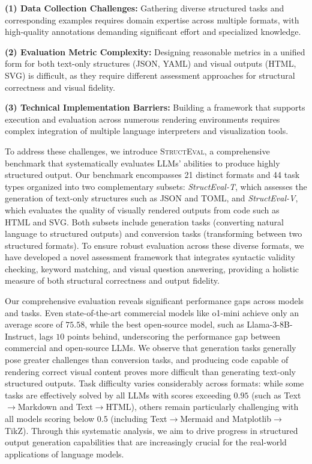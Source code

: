 \noindent \textbf{(1) Data Collection Challenges:} Gathering diverse structured tasks and corresponding examples requires domain expertise across multiple formats, with high-quality annotations demanding significant effort and specialized knowledge.

\noindent \textbf{(2) Evaluation Metric Complexity:} Designing reasonable metrics in a unified form for both text-only structures (JSON, YAML) and visual outputs (HTML, SVG) is difficult, as they require different assessment approaches for structural correctness and visual fidelity.

\noindent \textbf{(3) Technical Implementation Barriers:} Building a framework that supports execution and evaluation across numerous rendering environments requires complex integration of multiple language interpreters and visualization tools.

To address these challenges, we introduce \textsc{StructEval}, a comprehensive benchmark that systematically evaluates LLMs' abilities to produce highly structured output. Our benchmark encompasses 21 distinct formats and 44 task types organized into two complementary subsets: \emph{StructEval-T}, which assesses the generation of text-only structures such as JSON and TOML, and \emph{StructEval-V}, which evaluates the quality of visually rendered outputs from code such as HTML and SVG. Both subsets include generation tasks (converting natural language to structured outputs) and conversion tasks (transforming between two structured formats). To ensure robust evaluation across these diverse formats, we have developed a novel assessment framework that integrates syntactic validity checking, keyword matching, and visual question answering, providing a holistic measure of both structural correctness and output fidelity.


Our comprehensive evaluation reveals significant performance gaps across models and tasks. Even state-of-the-art commercial models like o1-mini achieve only an average score of $75.58$, while the best open-source model, such as Llama-3-8B-Instruct, lags $10$ points behind, underscoring the performance gap between commercial and open-source LLMs. We observe that generation tasks generally pose greater challenges than conversion tasks, and producing code capable of rendering correct visual content proves more difficult than generating text-only structured outputs. Task difficulty varies considerably across formats: while some tasks are effectively solved by all LLMs with scores exceeding $0.95$ (such as Text$\rightarrow$Markdown and Text$\rightarrow$HTML), others remain particularly challenging with all models scoring below $0.5$ (including Text$\rightarrow$Mermaid and Matplotlib$\rightarrow$TikZ). Through this systematic analysis, we aim to drive progress in structured output generation capabilities that are increasingly crucial for the real-world applications of language models.